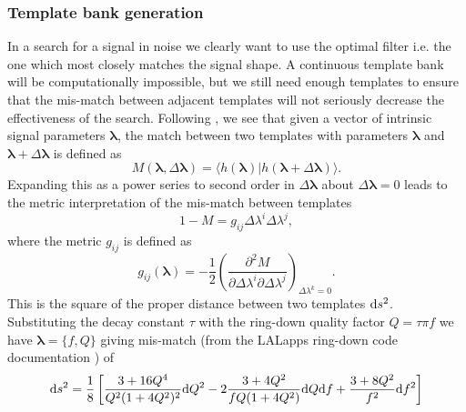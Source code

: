 \subsubsection{Template bank generation}
In a search for a signal in noise we clearly want to use the optimal filter i.e. the one which
most closely matches the signal shape. A continuous template bank will be computationally
impossible, but we still need enough templates to ensure that the mis-match between adjacent
templates will not seriously decrease the effectiveness of the search. Following \cite{Owen:1996},
we see that given a vector of intrinsic signal parameters $\boldsymbol{\lambda}$, the match between
two templates with parameters $\boldsymbol{\lambda}$ and
$\boldsymbol{\lambda}+\Delta\boldsymbol{\lambda}$ is defined as
\begin{equation}
M(\boldsymbol{\lambda},\Delta\boldsymbol{\lambda}) = \langle
h(\boldsymbol{\lambda})|h(\boldsymbol{\lambda} + \Delta\boldsymbol{\lambda})\rangle.
\end{equation}
Expanding this as a power series to second order in $\Delta\boldsymbol{\lambda}$ about
$\Delta\boldsymbol{\lambda}=0$ leads to the metric interpretation of the mis-match between templates
\begin{equation} 
1-M = g_{ij}\Delta\lambda^i\Delta\lambda^j,
\end{equation}
where the metric $g_{ij}$ is defined as
\begin{equation}
g_{ij}(\boldsymbol{\lambda}) = -\frac{1}{2}\left(\frac{\partial^2M}{\partial\Delta\lambda^i
\partial\Delta\lambda^j}\right)_{\Delta\lambda^k = 0}.
\end{equation}
This is the square of the proper distance between two templates ${\rm d}s^2$. Substituting the
decay constant $\tau$ with the ring-down quality factor $Q = \tau\pi{}f$ we have
$\boldsymbol{\lambda} = \{f,Q\}$ giving mis-match (from the LALapps ring-down code documentation
\cite{LALDocRing}) of 
\begin{equation}\label{properLengthSquared}
{\rm d}s^2 = \frac{1}{8}\left[\frac{3+16Q^4}{Q^2(1+4Q^2)^2}{\rm d}Q^2 -
2\frac{3+4Q^2}{fQ(1+4Q^2)}{\rm d}Q{\rm d}f + \frac{3+8Q^2}{f^2}{\rm d}f^2 \right]
\end{equation}

